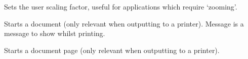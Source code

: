 \label{wxdcsetuserscale}


Sets the user scaling factor, useful for applications which require
`zooming'.

\label{wxdcstartdoc}


Starts a document (only relevant when outputting to a printer).
Message is a message to show whilst printing.

\label{wxdcstartpage}


Starts a document page (only relevant when outputting to a printer).

